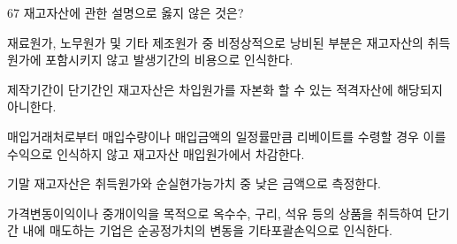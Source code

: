 \begin{question}{67}
재고자산에 관한 설명으로 옳지 않은 것은?
\begin{choices}
  \item 재료원가, 노무원가 및 기타 제조원가 중 비정상적으로 낭비된 부분은 재고자산의 취득원가에 포함시키지 않고 발생기간의 비용으로 인식한다.
  \item 제작기간이 단기간인 재고자산은 차입원가를 자본화 할 수 있는 적격자산에 해당되지 아니한다.
  \item 매입거래처로부터 매입수량이나 매입금액의 일정률만큼 리베이트를 수령할 경우 이를 수익으로 인식하지 않고 재고자산 매입원가에서 차감한다.
  \item 기말 재고자산은 취득원가와 순실현가능가치 중 낮은 금액으로 측정한다.
  \item 가격변동이익이나 중개이익을 목적으로 옥수수, 구리, 석유 등의 상품을 취득하여 단기간 내에 매도하는 기업은 순공정가치의 변동을 기타포괄손익으로 인식한다.
\end{choices}
\end{question}
